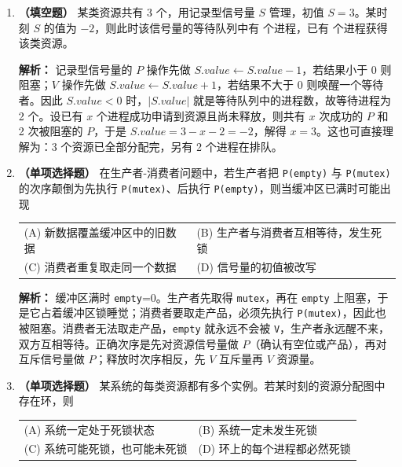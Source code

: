 \begin{enumerate}
\vspace{8pt}

\item \textbf{（填空题）} 某类资源共有 3 个，用记录型信号量 $S$ 管理，初值 $S=3$。某时刻 $S$ 的值为 $-2$，则此时该信号量的等待队列中有 \underline{\qquad} 个进程，已有 \underline{\qquad} 个进程获得该类资源。

\ifshowsolutions\par\noindent\textbf{解析：} 记录型信号量的 $P$ 操作先做 $S.value\gets S.value-1$，若结果小于 0 则阻塞；$V$ 操作先做 $S.value\gets S.value+1$，若结果不大于 0 则唤醒一个等待者。因此 $S.value<0$ 时，$|S.value|$ 就是等待队列中的进程数，故等待进程为 2 个。设已有 $x$ 个进程成功申请到资源且尚未释放，则共有 $x$ 次成功的 $P$ 和 2 次被阻塞的 $P$，于是 $S.value=3-x-2=-2$，解得 $x=3$。这也可直接理解为：3 个资源已全部分配完，另有 2 个进程在排队。\else \answerarea \fi

\vspace{8pt}

\item \textbf{（单项选择题）} 在生产者-消费者问题中，若生产者把 \texttt{P(empty)} 与 \texttt{P(mutex)} 的次序颠倒为先执行 \texttt{P(mutex)}、后执行 \texttt{P(empty)}，则当缓冲区已满时可能出现
\begin{center}
\begin{tabular}{ll}
(A) 新数据覆盖缓冲区中的旧数据 & (B) 生产者与消费者互相等待，发生死锁 \\[4pt]
(C) 消费者重复取走同一个数据 & (D) 信号量的初值被改写
\end{tabular}
\end{center}

\ifshowsolutions\par\noindent\textbf{解析：} 缓冲区满时 \texttt{empty}=0。生产者先取得 \texttt{mutex}，再在 \texttt{empty} 上阻塞，于是它占着缓冲区锁睡觉；消费者要取走产品，必须先执行 \texttt{P(mutex)}，因此也被阻塞。消费者无法取走产品，\texttt{empty} 就永远不会被 \texttt{V}，生产者永远醒不来，双方互相等待。正确次序是先对资源信号量做 $P$（确认有空位或产品），再对互斥信号量做 $P$；释放时次序相反，先 $V$ 互斥量再 $V$ 资源量。\else \answerarea \fi

\vspace{8pt}

\item \textbf{（单项选择题）} 某系统的每类资源都有多个实例。若某时刻的资源分配图中存在环，则
\begin{center}
\begin{tabular}{ll}
(A) 系统一定处于死锁状态 & (B) 系统一定未发生死锁 \\[4pt]
(C) 系统可能死锁，也可能未死锁 & (D) 环上的每个进程都必然死锁
\end{tabular}
\end{center}


\end{enumerate}
